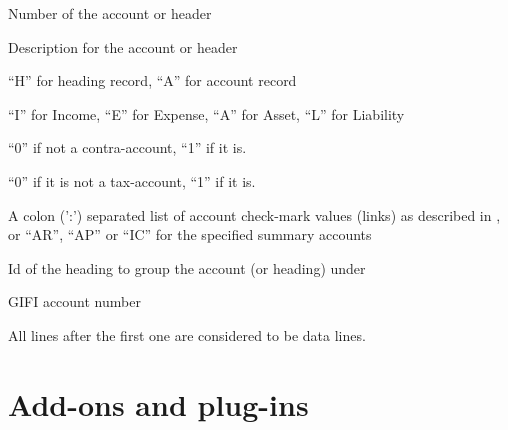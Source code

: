 \begin{description}[style=nextline]
\item [accno] Number of the account or header
\item [desc] Description for the account or header
\item [charttype] ``H'' for heading record, ``A'' for account record
\item [category] ``I'' for Income, ``E'' for Expense, ``A'' for Asset, ``L'' for Liability
\item [contra] ``0'' if not a contra-account, ``1'' if it is.
\item [tax] ``0'' if it is not a tax-account, ``1'' if it is.
\item [link] A colon (':') separated list of account check-mark values (links) as described
    in , or ``AR'', ``AP'' or ``IC'' for the specified summary accounts
\item [heading] Id of the heading to group the account (or heading) under
\item [gifi] GIFI account number
\end{description}

All lines after the first one are considered to be data lines.

\chapter{Add-ons and plug-ins}
\label{cha-customization-add-ons}


